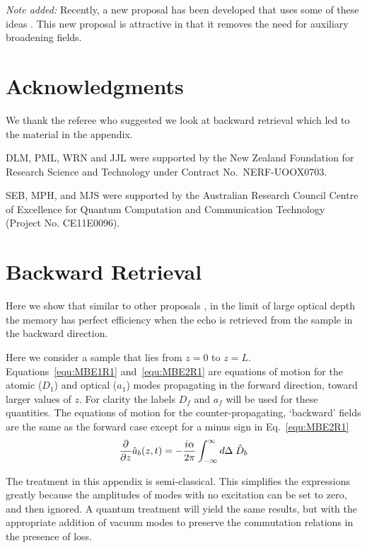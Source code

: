 \documentclass[superscriptaddress,pra,twocolumn,showpacs,amsmath,amssymb,aps,a4paper]{revtex4}
\begin{document}
\textit{Note added:} Recently, a new proposal has been developed that uses some of these ideas \cite{rose}. This new proposal is attractive in that it removes the need for auxiliary broadening fields.


\section{Acknowledgments}

We thank the referee who suggested we look at backward retrieval which led to the material in the appendix.

DLM, PML, WRN and JJL were supported by the New Zealand Foundation for Research Science and Technology under Contract No.\ NERF-UOOX0703.

SEB, MPH, and MJS were supported by the Australian Research Council Centre of Excellence for Quantum Computation and Communication Technology (Project No. CE11E0096).


\appendix*

\section{Backward Retrieval}

Here we show that similar to other proposals \cite{mois01,afze09,rose}, in the limit of large optical depth the memory has perfect efficiency when the echo is retrieved from the sample in the backward direction.

Here we consider a sample that lies from $z=0$ to $z=L$. Equations~\ref{equ:MBE1R1} and~\ref{equ:MBE2R1} are equations of motion for the atomic ($D_1$) and optical ($a_1$) modes propagating in the forward direction, toward larger values of $z$. For clarity the labels $D_f$  and $a_f$ will be used for these quantities. The equations of motion for the counter-propagating, `backward' fields are the same as the forward case except for a minus sign in Eq.~\ref{equ:MBE2R1}
\begin{equation}
    \frac{\partial}{\partial z}  \hat{a}_{b}(z,t) = {\bf -}\frac{i \alpha}{2 \pi} \int_{-\infty}^{\infty} d\Delta \;   \hat{D}_{b}
\end{equation}

The treatment in this appendix is semi-classical. This simplifies the expressions greatly because the amplitudes of modes with no excitation can be set to zero, and then ignored. A quantum treatment will yield the same results, but with the appropriate addition of vacuum modes to preserve the commutation relations in the presence of loss.
\end{document}
